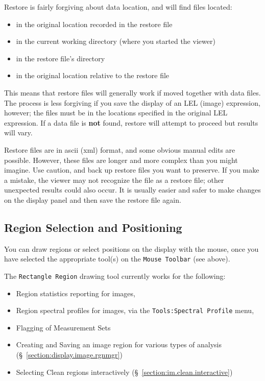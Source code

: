 Restore is fairly forgiving about data location, and will find files located:
\begin{itemize}
  \item in the original location recorded in the restore file
  \item in the current working directory (where you started the viewer)
  \item in the restore file's directory
  \item in the original location relative to the restore file
\end{itemize}
This means that restore files will generally work if moved together with
data files.  The process is less forgiving if you save the display of an
LEL (image) expression, however; the files must be in the locations specified
in the original LEL expression.  If a data file is {\bf not} found, restore
will attempt to proceed but results will vary. 

Restore files are in ascii (xml) format, and some obvious manual edits are
possible.  However, these files are longer and more complex than you might
imagine.  Use caution, and back up restore files you want to preserve.
If you make a mistake, the viewer may not recognize the file as a restore
file; other unexpected results could also occur.  It is usually easier
and safer to make changes on the display panel and then save the restore
file again.


\subsection{Region Selection and Positioning}
\label{section:display.viewerGUI.displaypanel.region}

You can draw regions or select positions on the display with the mouse,
once you have selected the appropriate tool(s) on the {\tt Mouse Toolbar}
(see above).

The {\tt Rectangle Region} drawing tool currently works for the following: 
\begin{itemize}
  \item Region statistics reporting for images,
  \item Region spectral profiles for images, via the
        {\tt Tools:Spectral Profile} menu,
  \item Flagging of Measurement Sets
  \item Creating and Saving an image region for various types of analysis
        (\S~\ref{section:display.image.rgnmgr})
  \item Selecting Clean regions interactively (\S~\ref{section:im.clean.interactive})
\end{itemize}

